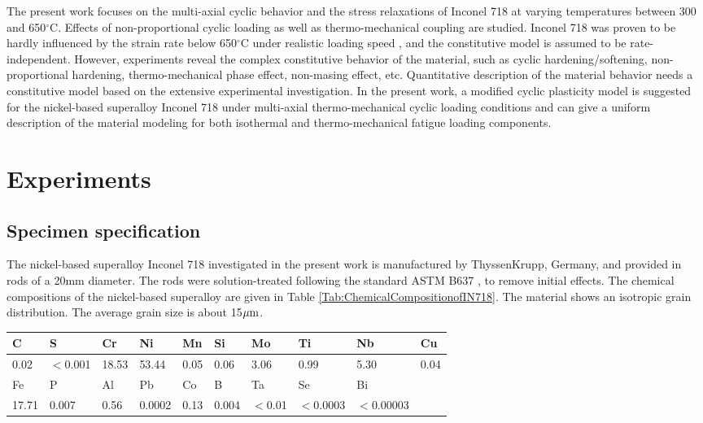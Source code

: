 \documentclass[preprint,5p,twocolumn,11pt,sort&compress]{elsarticle}
\begin{document}
The present work focuses on the multi-axial cyclic behavior and the stress relaxations of Inconel 718 at varying temperatures between 300 and 650$^{\circ}$C. Effects of non-proportional cyclic loading as well as thermo-mechanical coupling are studied. Inconel 718 was proven to be hardly influenced by the strain rate below 650$^{\circ}$C under realistic loading speed \cite{kim1988elevated, Schlesinger2017}, and the constitutive model is assumed to be rate-independent. However,  experiments reveal the complex constitutive behavior of the material, such as cyclic hardening/softening, non-proportional hardening, thermo-mechanical phase effect, non-masing effect, etc. Quantitative description of the material behavior needs a constitutive model based on the extensive experimental investigation. In the present work, a modified cyclic plasticity model is suggested for the nickel-based superalloy Inconel 718 under multi-axial thermo-mechanical cyclic loading conditions and can give a uniform description of the material modeling for both isothermal and thermo-mechanical fatigue loading components.

\section{Experiments}

\subsection{Specimen specification}
\noindent The nickel-based superalloy Inconel 718 investigated in the present work is manufactured by ThyssenKrupp, Germany, and provided in rods of a 20mm diameter. The rods were solution-treated following the standard ASTM B637 \cite{ASTMB63716}, to remove initial effects.
The chemical compositions of the nickel-based superalloy are given in Table \ref{Tab:ChemicalCompositionofIN718}. The material shows an isotropic grain distribution. The average grain size is about 15$\rm{\mu m}$.

\begin{table*}[htbp]
  \centering
  \caption{Chemical composition of the investigated material Inconel 718 (wt. \%).}
    \begin{tabular}{llllllllll}
    \hline
    C     & S     & Cr    & Ni    & Mn    & Si    & Mo    & Ti    & Nb    & Cu \\
    \hline
    0.02  & $<$0.001 & 18.53 & 53.44 & 0.05  & 0.06  & 3.06  & 0.99  & 5.30  & 0.04 \\
    \hline
    Fe    & P     & Al    & Pb    & Co    & B     & Ta    & Se    & Bi    &  \\
    \hline
    17.71 & 0.007 & 0.56  & 0.0002 & 0.13  & 0.004 & $<$0.01 & $<$0.0003 & $<$0.00003 &  \\
    \hline
    \end{tabular}%
  \label{Tab:ChemicalCompositionofIN718}%
\end{table*}%
\end{document}
